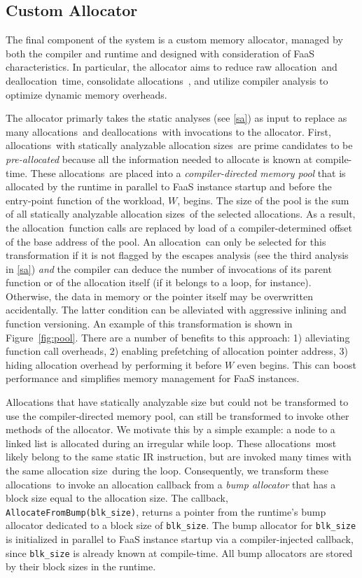 \documentclass{article}
\def\ALL{allocation}
\def\DALL{deallocation}
\def\ALLS{allocations}
\def\DALLS{deallocations}
\def\SIZE{allocation size}
\def\SIZES{allocation sizes}
\begin{document}
\subsection{Custom Allocator} \label{ca}
The final component of the system is a custom memory allocator, managed by both
the compiler and runtime and designed with consideration of FaaS characteristics.
In particular, the allocator aims to reduce raw \ALL\ and \DALL\ time, consolidate 
\ALLS\ , and utilize compiler analysis to optimize dynamic memory overheads. 

The allocator primarly takes the static analyses (see \ref{sa})
as input to replace as many \ALLS\ and \DALLS\ with invocations to the allocator. 
First, \ALLS\ with statically analyzable \SIZES\ are prime candidates to be 
\textit{pre-allocated} because all the information needed to allocate is known at
compile-time. These \ALLS\ are placed into a \textit{compiler-directed memory pool} that is
allocated by the runtime in parallel to FaaS instance startup and before the entry-point function 
of the workload, $W$, begins. The size of the pool is the sum of all statically 
analyzable \SIZES\ of the selected \ALLS . As a result, the \ALL\ function calls are 
replaced by load of a compiler-determined offset of the base address of the pool.
An \ALL\ can only be selected for this transformation if it is not flagged by 
the escapes analysis (see the third analysis in \ref{sa}) \textit{and} the compiler 
can deduce the number of invocations of its parent function or of the allocation
itself (if it belongs to a loop, for instance). Otherwise, the data
in memory or the pointer itself may be overwritten accidentally. The latter condition
can be alleviated with aggressive inlining and function versioning. An example of 
this transformation is shown in Figure~\ref{fig:pool}. There are a number of 
benefits to this approach: 1) alleviating function call overheads, 2) enabling 
prefetching of allocation pointer address, 3) hiding allocation overhead by performing 
it before $W$ even begins. This can boost performance and simplifies memory management
for FaaS instances. 

Allocations that have statically analyzable size but could not be transformed to
use the compiler-directed memory pool, can still be transformed to invoke other
methods of the allocator. We motivate this by a simple example: a node 
to a linked list is allocated during an irregular while loop. These \ALLS\ most
likely belong to the same static IR instruction, but are invoked many times with
the same \SIZE\ during the loop. Consequently, we transform these \ALLS\ to 
invoke an allocation callback from a \textit{bump allocator} that has a block size equal to the 
\SIZE . The callback, \texttt{AllocateFromBump(blk\_size)}, returns a pointer from the
runtime's bump allocator dedicated to a block size of \texttt{blk\_size}. The bump allocator
for \texttt{blk\_size} is initialized in parallel to FaaS instance startup via 
a compiler-injected callback, since \texttt{blk\_size} is already known at compile-time.
All bump allocators are stored by their block sizes in the runtime.
\end{document}
